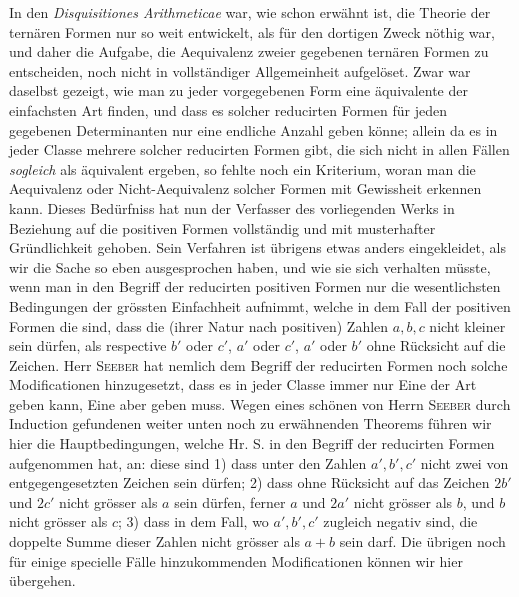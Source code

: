 In den \emph{Disquisitiones Arithmeticae} war, wie schon erwähnt ist, die Theorie der ternären Formen nur so weit entwickelt, als für den dortigen Zweck nöthig war, und daher die Aufgabe, die Aequivalenz zweier gegebenen ternären Formen zu entscheiden, noch nicht in vollständiger Allgemeinheit aufgelöset. Zwar war daselbst gezeigt, wie man zu jeder vorgegebenen Form eine äquivalente der einfachsten Art finden, und dass es solcher reducirten Formen für jeden gegebenen Determinanten nur eine endliche Anzahl geben könne; allein da es in jeder Classe mehrere solcher reducirten Formen gibt, die sich nicht in allen Fällen \emph{sogleich} als äquivalent ergeben, so fehlte noch ein Kriterium, woran man die Aequivalenz oder Nicht-Aequivalenz solcher Formen mit Gewissheit erkennen kann. Dieses Bedürfniss hat nun der Verfasser des vorliegenden Werks in Beziehung auf die positiven Formen vollständig und mit musterhafter Gründlichkeit gehoben. Sein Verfahren ist übrigens etwas anders eingekleidet, als wir die Sache so eben ausgesprochen haben, und wie sie sich verhalten müsste, wenn man in den Begriff der reducirten positiven Formen nur die wesentlichsten Bedingungen der grössten Einfachheit aufnimmt, welche in dem Fall der positiven Formen die sind, dass die (ihrer Natur nach positiven) Zahlen $a,b,c$ nicht kleiner sein dürfen, als respective $b'$ oder $c'$, $a'$ oder $c'$, $a'$ oder $b'$ ohne Rücksicht auf die Zeichen. Herr \textsc{Seeber} hat nemlich dem Begriff der reducirten Formen noch solche Modificationen hinzugesetzt, dass es in jeder Classe immer nur Eine der Art geben kann, Eine aber geben muss. Wegen eines schönen von Herrn \textsc{Seeber} durch Induction gefundenen weiter unten noch zu erwähnenden Theorems führen wir hier die Hauptbedingungen, welche Hr. S. in den Begriff der reducirten Formen 
aufgenommen hat, an: diese sind 1) dass unter den Zahlen $a',b',c'$ nicht zwei von entgegengesetzten Zeichen sein dürfen; 2) dass ohne Rücksicht auf das Zeichen $2b'$ und $2c'$ nicht grösser als $a$ sein dürfen, ferner $a$ und $2a'$ nicht grösser als $b$, und $b$ nicht grösser als $c$; 3) dass in dem Fall, wo $a',b',c'$ zugleich negativ sind, die doppelte Summe dieser Zahlen nicht grösser als $a+b$ sein darf. Die übrigen noch für einige specielle Fälle hinzukommenden Modificationen können wir hier übergehen.

